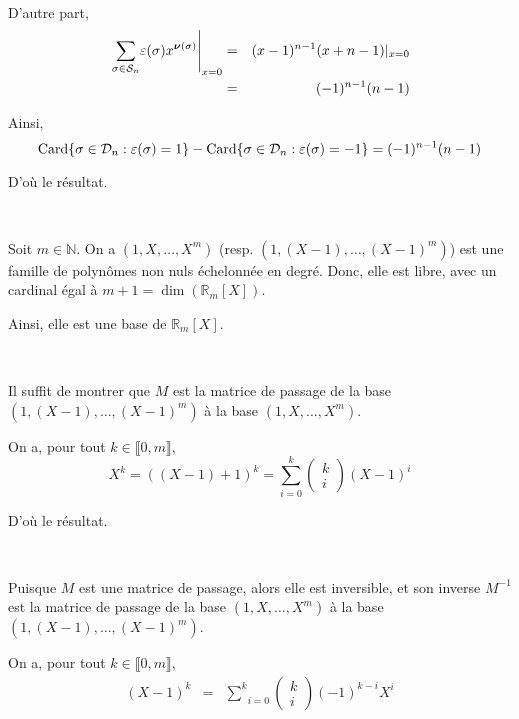 \

D'autre part,
\begin{eqnarray*}
  \left. \underset{\sigma \in \mathcal{S}_n}{\sum} \varepsilon (\sigma)
  x^{\boldsymbol{\nu} (\sigma)} \right|_{x = 0} & = &  (x - 1)^{n - 1}
  (x + n - 1) |_{x = 0}\\
  & = & (- 1)^{n - 1} (n - 1)
\end{eqnarray*}


Ainsi,
\[ \operatorname{Card} \{ \sigma \in \mathcal{D}_n : \varepsilon (\sigma) = 1 \} -
   \operatorname{Card} \{ \sigma \in \mathcal{D}_n : \varepsilon (\sigma) = - 1 \} =
   (- 1)^{n - 1} (n - 1) \]


D'o{\`u} le r{\'e}sultat.

\

 Soit $m \in \mathbb{N}$. On a $(1, X, \ldots, X^m)$ (resp.
$(1, (X - 1), \ldots, (X - 1)^m)$) est une famille de polyn{\^o}mes non nuls
{\'e}chelonn{\'e}e en degr{\'e}. Donc, elle est libre, avec un cardinal
{\'e}gal {\`a} $m + 1 = \dim (\mathbb{R}_m [X])$.

Ainsi, elle est une base de $\mathbb{R}_m [X]$.

\

 Il suffit de montrer que $M$ est la matrice de passage de la
base $(1, (X - 1), \ldots, (X - 1)^m)$ {\`a} la base $(1, X, \ldots, X^m)$.

On a, pour tout $k \in \llbracket 0, m \rrbracket$,
\[ X^k = ((X - 1) + 1)^k = \underset{i = 0}{\overset{k}{\sum}} \left(
   \begin{array}{c}
     k\\
     i
   \end{array} \right) (X - 1)^i \]


D'o{\`u} le r{\'e}sultat.

\

 Puisque $M$ est une matrice de passage, alors elle est
inversible, et son inverse $M^{- 1}$ est la matrice de passage de la base $(1,
X, \ldots, X^m)$ {\`a} la base $(1, (X - 1), \ldots, (X - 1)^m)$.

On a, pour tout $k \in \llbracket 0, m \rrbracket$,
\[ \begin{array}{lll}
     (X - 1)^k & = & \underset{i = 0}{\overset{k}{\sum}} \left(
     \begin{array}{c}
       k\\
       i
     \end{array} \right) (- 1)^{k - i} X^i
   \end{array} \]


